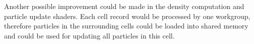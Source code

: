 \documentclass[a4paper,report]{IEEEtran}
\begin{document}
Another possible improvement could be made in the density computation and particle update shaders. Each cell record would be processed by one workgroup, therefore particles in the surrounding cells could be loaded into shared memory and could be used for updating all particles in this cell.

%
%



%
%
\end{document}
